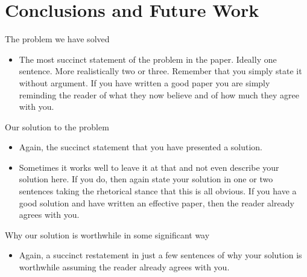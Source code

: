\section{Conclusions and Future Work}

The problem we have solved
\begin{itemize}
    \item The most succinct statement of the problem in the paper. Ideally one sentence. More realistically two or three. Remember that you simply state it without argument. If you have written a good paper you are simply reminding the reader of what they now believe and of how much they agree with you.
\end{itemize}

Our solution to the problem
\begin{itemize}
    \item Again, the succinct statement that you have presented a solution.
    \item Sometimes it works well to leave it at that and not even describe your
solution here. If you do, then again state your solution in one or two sentences taking the rhetorical stance that this is all obvious. If you have a good solution and have written an effective paper, then the reader already agrees with you.
\end{itemize}

Why our solution is worthwhile in some significant way
\begin{itemize}
    \item Again, a succinct restatement in just a few sentences of why your solution is worthwhile assuming the reader already agrees with you.
\end{itemize}
